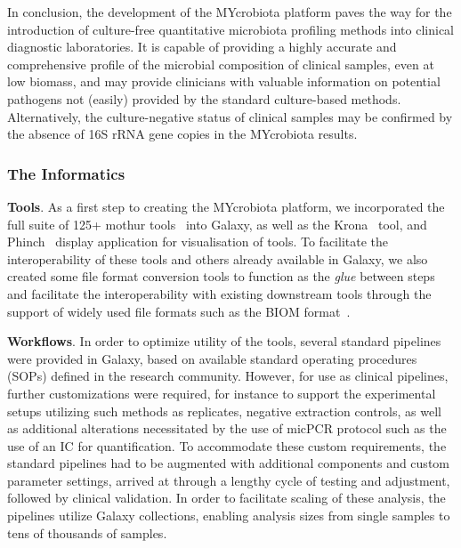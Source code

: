 In conclusion, the development of the MYcrobiota platform paves the way for the introduction of culture-free quantitative microbiota profiling methods into clinical diagnostic laboratories. It is capable of providing a highly accurate and comprehensive profile of the microbial composition of clinical samples, even at low biomass, and may provide clinicians with valuable information on potential pathogens not (easily) provided by the standard culture-based methods. Alternatively, the culture-negative status of clinical samples may be confirmed by the absence of 16S rRNA gene copies in the MYcrobiota results.

\subsubsection{The Informatics}

\textbf{Tools}. As a first step to creating the MYcrobiota platform, we incorporated the full suite of 125+ mothur tools~\cite{schloss} into Galaxy, as well as the Krona~\cite{ondov2015krona} tool, and Phinch~\cite{bik2014phinch} display application for visualisation of tools. To facilitate the interoperability of these tools and others already available in Galaxy, we also created some file format conversion tools to function as the \emph{glue} between steps and facilitate the interoperability with existing downstream tools through the support of widely used file formats such as the BIOM format~\cite{mcdonald2012biological}.


\textbf{Workflows}. In order to optimize utility of the tools, several standard pipelines were provided in Galaxy, based on available standard operating procedures (SOPs) defined in the research community. However, for use as clinical pipelines, further customizations were required, for instance to support the experimental setups utilizing such methods as replicates, negative extraction controls, as well as additional alterations necessitated by the use of micPCR protocol such as the use of an IC for quantification. To accommodate these custom requirements, the standard pipelines had to be augmented with additional components and custom parameter settings, arrived at through a lengthy cycle of testing and adjustment, followed by clinical validation. In order to facilitate scaling of these analysis, the pipelines utilize Galaxy collections, enabling analysis sizes from single samples to tens of thousands of samples.


